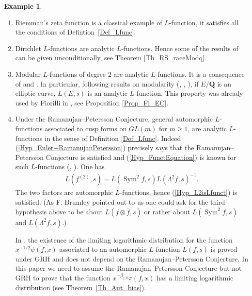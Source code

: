 \documentclass[a4paper,10pt]{amsart}
\theoremstyle{plain}
\theoremstyle{definition}
\newtheorem{ex}{Example}
\begin{document}
\begin{ex}\label{Ex_Lfunc}
	\begin{enumerate}
	    \item\label{Ex_Lfunc_zeta} Riemman's zeta function is a classical example of $L$-function, it satisfies all the conditions of Defintion~\ref{Def_Lfunc}.
		\item\label{Ex_Lfunc_Dirichlet} Dirichlet $L$-functions are analytic $L$-functions. Hence some of the results of \cite{RS} can be given unconditionally, see Theorem \ref{Th_RS_raceModq}.
		
		\item\label{Ex_Lfunc_Modular2} Modular $L$-functions of degree $2$ are analytic $L$-functions.
		It is a consequence of \cite[Th. 8.2]{Deligne_Weil1} and \cite{DeligneSerre}.
		In particular, following results on modularity (\cite{Wiles_ModEll}, \cite{TaylorWiles_Modularity}, \cite{BCDT_Modularity}), 
		if $E/\mathbf{Q}$ is an elliptic curve, $L(E,s)$ is an analytic $L$-function.
		This property was already used by Fiorilli in \cite{FioEC}, see Proposition \ref{Prop_Fi_EC}.
		
		
		\item\label{Ex_Lfunc_cusp} Under the Ramanujan--Petersson Conjecture, general automorphic $L$-functions associated to cusp forms on $GL(m)$ for $m\geq 1$, are analytic $L$-functions in the sense of Definition \ref{Def_Lfunc}.
		Indeed (\ref{Hyp_Euler+RamanujanPetersson}) precisely says that the Ramanujan--Petersson Conjecture is satisfied
		and (\ref{Hyp_FunctEquation}) is known for such $L$-functions (\cite{GodementJacquet}, \cite{Cogdell}).
		One has
		\begin{align*}
		L(f^{(2)},s) = L(\operatorname{Sym}^{2}f,s)L(\Lambda^{2}f,s)^{-1}.
		\end{align*}
		The two factors are automorphic $L$-functions,
		hence (\ref{Hyp_L2isLfunct}) is satisfied. 
		(As F. Brumley pointed out to us one could ask for the third hypothesis above to be about $L(f\otimes\overline{f},s)$ or rather about $L(\operatorname{Sym}^{2}f,s)$ and $L(\Lambda^{2}f,s)$.)
		
		In \cite[Cor. 1.5]{ANS}, the existence of the limiting logarithmic distribution 
		for the function $x^{-1/2}\psi(f,x)$ associated to an automorphic $L$-function $L(f,s)$ is proved under GRH 
		and does not depend on the Ramanujan--Petersson Conjecture.
		In this paper we need to assume the Ramanujan--Petersson Conjecture but not GRH to prove that 
		the function $x^{-\beta_{f,0}}\pi(f,x)$ 
		has a limiting logarithmic distribution (see Theorem~\ref{Th_Aut_bias}). 
		

\end{enumerate}
\end{ex}
\end{document}
